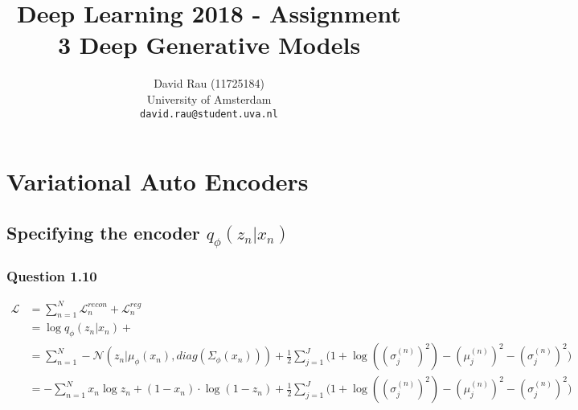 \documentclass{article}
\title{Deep Learning 2018 - Assignment 3 Deep Generative Models}
\author{
  David Rau (11725184) \\ 
  University of Amsterdam \\
  \texttt{david.rau@student.uva.nl} \\
}
\begin{document}

\maketitle


\section*{Variational Auto Encoders}
\subsection*{Specifying the encoder $q_\phi(z_n|x_n)$}
\subsubsection*{Question 1.10}
\begin{equation}
\begin{aligned}
	\mathcal{L} & = \sum_{n=1}^N \mathcal{L}_n^{recon} + \mathcal{L}_n^{reg} \\
	& =  \log q_{\phi}(z_n|x_n) +  \\
	& = \sum_{n=1}^N  - \mathcal{N}(z_n|\mu_{\phi}(x_n), diag(\Sigma_{\phi}(x_n))) +\frac{1}{2} \sum_{j=1}^J \big( 1 + \log ( (\sigma_j^{(n)})^2) - (\mu_j^{(n)})^2 - (\sigma_j^{(n)})^2 \big)
\\
	& = - \sum_{n=1}^N x_n \log z_n + (1-x_n) \cdot \log (1 -z_n) +\frac{1}{2} \sum_{j=1}^J \big( 1 + \log ( (\sigma_j^{(n)})^2) - (\mu_j^{(n)})^2 - (\sigma_j^{(n)})^2 \big)
\end{aligned}
\end{equation}
 
\end{document}
